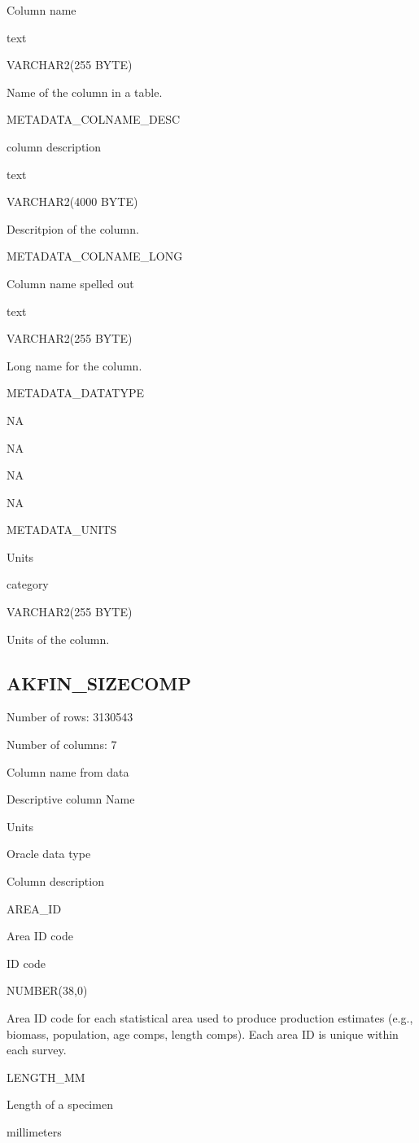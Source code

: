 \documentclass[
  letterpaper,
  oneside,
  open=any]{scrbook}
\begin{document}
Column name

text

VARCHAR2(255 BYTE)

Name of the column in a table.

METADATA\_COLNAME\_DESC

column description

text

VARCHAR2(4000 BYTE)

Descritpion of the column.

METADATA\_COLNAME\_LONG

Column name spelled out

text

VARCHAR2(255 BYTE)

Long name for the column.

METADATA\_DATATYPE

NA

NA

NA

NA

METADATA\_UNITS

Units

category

VARCHAR2(255 BYTE)

Units of the column.

\hypertarget{akfin_sizecomp}{%
\subsection{AKFIN\_SIZECOMP}\label{akfin_sizecomp}}

Number of rows: 3130543

Number of columns: 7

Column name from data

Descriptive column Name

Units

Oracle data type

Column description

AREA\_ID

Area ID code

ID code

NUMBER(38,0)

Area ID code for each statistical area used to produce production
estimates (e.g., biomass, population, age comps, length comps). Each
area ID is unique within each survey.

LENGTH\_MM

Length of a specimen

millimeters
\end{document}
